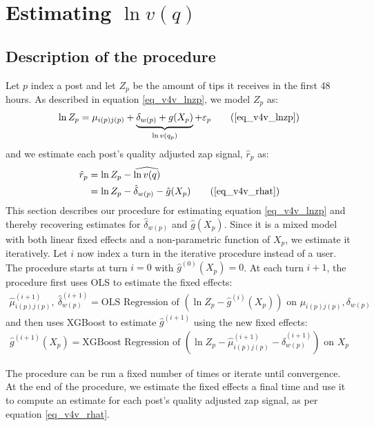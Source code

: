 \section{Estimating $\ln v(q)$} \label{sec_embeddings}

\subsection{Description of the procedure}

Let $p$ index a post and let $Z_p$ be the amount of tips it receives in the first 48 hours. As described in equation \eqref{eq_v4v_lnzp}, we model $Z_p$ as:
\begin{align}
\ln Z_p = \mu_{i(p)j(p)} + \underbrace{\delta_{w(p)} + g(X_p)}_{\ln v(q_p)} + \varepsilon_p \tag{\ref{eq_v4v_lnzp}}
\end{align}
and we estimate each post's quality adjusted zap signal, $\hat{r}_p$ as:
\begin{align}
\hat{r}_p &= \ln Z_p - \widehat{\ln v(q)} \nonumber \\
& = \ln Z_p - \hat{\delta}_{w(p)}-\hat{g}(X_p) \tag{\ref{eq_v4v_rhat}}
\end{align}
This section describes our procedure for estimating equation \eqref{eq_v4v_lnzp} and thereby recovering estimates for $\hat{\delta}_{w(p)}$ and $\hat{g}(X_p)$. Since it is a mixed model with both linear fixed effects and a non-parametric function of $X_p$, we estimate it iteratively. Let $i$ now index a turn in the iterative procedure instead of a user. The procedure starts at turn $i=0$ with $\hat{g}^{(0)}(X_p)=0$. At each turn $i+1$, the procedure first uses OLS to estimate the fixed effects:
\begin{align}
\hat{\mu}^{(i+1)}_{i(p)j(p)},~ \hat{\delta}^{(i+1)}_{w(p)} = \text{OLS Regression of } \left(\ln Z_p - \hat{g}^{(i)}(X_p) \right) \text{ on } \mu_{i(p)j(p)},\delta_{w(p)}
\end{align}
and then uses XGBoost to estimate $\hat{g}^{(i+1)}$ using the new fixed effects:
\begin{align}
\hat{g}^{(i+1)}(X_p) = \text{XGBoost Regression of } \left( \ln Z_p - \hat{\mu}^{(i+1)}_{i(p)j(p)} - \hat{\delta}^{(i+1)}_{w(p)} \right) \text{ on } X_p \label{eq_apdx_xgboost}
\end{align}

The procedure can be run a fixed number of times or iterate until convergence. At the end of the procedure, we estimate the fixed effects a final time and use it to compute an estimate for each post's quality adjusted zap signal, as per equation \eqref{eq_v4v_rhat}.


